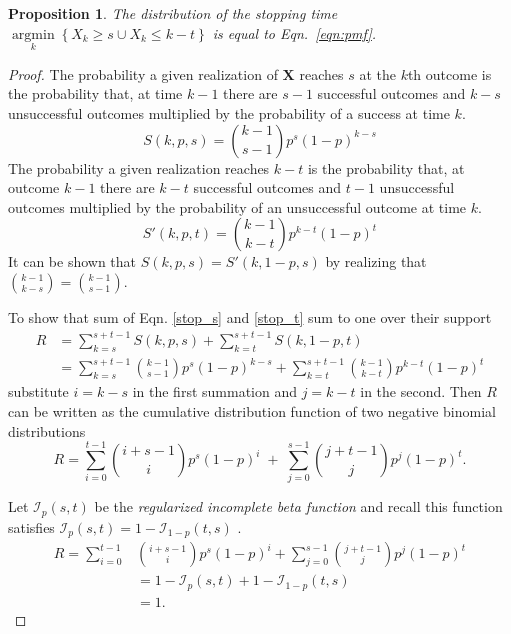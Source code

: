 \documentclass[review]{elsarticle}
\DeclareMathOperator*{\argmin}{argmin}
\newcommand*{\argminl}{\argmin\limits}
\newtheorem{prop}{Proposition}
\begin{document}
\begin{prop}
The distribution of the stopping time
$\argminl_k \left\{ X_k \geq s \cup X_k \leq k-t \right\}$
is equal to Eqn.~\ref{eqn:pmf}.
\end{prop}
\begin{proof}

The probability a given realization of $\mathbf{X}$ reaches $s$ at
the $k$th outcome is the probability that, at time $k-1$ there are $s-1$
successful outcomes and $k-s$ unsuccessful outcomes multiplied by
the probability of a
success at time $k$. 
\begin{equation} \label{stop_s}
S(k, p, s) = {k-1 \choose s-1} p^s (1-p)^{k-s}
\end{equation}
The probability a given realization reaches $k-t$
is the probability that, at outcome $k-1$ there are $k-t$ successful outcomes
and $t-1$ unsuccessful outcomes multiplied by the probability of an
unsuccessful outcome at time $k$.  
\begin{equation} \label{stop_t}
S'(k, p, t) = {k-1 \choose k-t} p^{k-t} (1-p)^t
\end{equation}
It can be shown that $S(k, p, s) = S'(k, 1-p, s)$ by realizing that 
${k-1 \choose k-s} = {k-1 \choose s-1}$.

To show that sum of Eqn. \ref{stop_s} and \ref{stop_t} sum to one
over their support 
\begin{align} \label{eqn:sum_proof}
R &= \sum_{k=s}^{s+t-1} S(k, p, s) + \sum_{k=t}^{s+t-1} S(k, 1-p, t) \\
  &= \sum_{k=s}^{s+t-1} {k-1 \choose s-1} p^s (1-p)^{k-s} + \sum_{k=t}^{s+t-1} {k-1 \choose k-t} p^{k-t} (1-p)^t
\end{align}
substitute $i=k-s$ in the first summation and $j=k-t$ in the second.
Then $R$ can be written
as the cumulative distribution function of two
negative binomial distributions
\begin{equation} \label{eqn:transformed_sum}
R = \sum_{i=0}^{t-1} {i+s-1 \choose i} p^s (1-p)^i \; + \;
\sum_{j=0}^{s-1} {j+t-1 \choose j} p^j (1-p)^t.
\end{equation}

Let $\mathcal{I}_p(s, t)$ be the {\em regularized incomplete beta function}
and recall this function satisfies 
$\mathcal{I}_p(s, t) = 1-\mathcal{I}_{1-p}(t, s)$ \citep{Abramowitz1964}.
\begin{align*}
R = \sum_{i=0}^{t-1} &{i+s-1 \choose i} p^s (1-p)^i +
\sum_{j=0}^{s-1}  {j+t-1 \choose j} p^j  (1-p)^t \\
   &= 1-\mathcal{I}_p(s, t) + 1 - \mathcal{I}_{1-p}(t, s) \\
   &= 1. 
\end{align*}
\end{proof}
\end{document}
